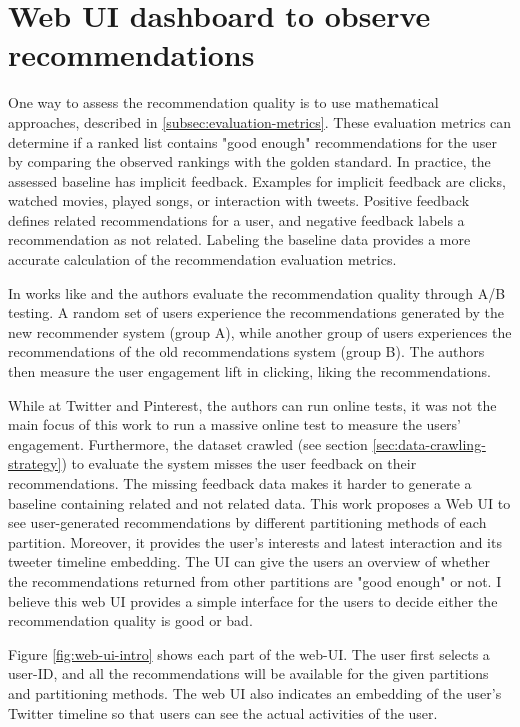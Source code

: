 \section{Web UI dashboard to observe recommendations}
\label{sec:web-ui}
One way to assess the recommendation quality is to use mathematical approaches, described in \ref{subsec:evaluation-metrics}. These evaluation metrics can determine if a ranked list contains "good enough" recommendations for the user by comparing the observed rankings with the golden standard. In practice, the assessed baseline has implicit feedback. Examples for implicit feedback are clicks, watched movies, played songs, or interaction with tweets. Positive feedback defines related recommendations for a user, and negative feedback labels a recommendation as not related. Labeling the baseline data provides a more accurate calculation of the recommendation evaluation metrics.


In works like \cite{eksombatchaiPixieSystemRecommending2018} and \cite{goelWhoToFollowSystemTwitter2015} the authors evaluate the recommendation quality through A/B testing. A random set of users experience the recommendations generated by the new recommender system (group A), while another group of users experiences the recommendations of the old recommendations system (group B). The authors then measure the user engagement lift in clicking, liking the recommendations. 


While at Twitter and Pinterest, the authors can run online tests, it was not the main focus of this work to run a massive online test to measure the users' engagement. Furthermore, the dataset crawled (see section \ref{sec:data-crawling-strategy}) to evaluate the system misses the user feedback on their recommendations. The missing feedback data makes it harder to generate a baseline containing related and not related data. This work proposes a Web UI to see user-generated recommendations by different partitioning methods of each partition. Moreover, it provides the user's interests and latest interaction and its tweeter timeline embedding. The UI can give the users an overview of whether the recommendations returned from other partitions are "good enough" or not. I believe this web UI provides a simple interface for the users to decide either the recommendation quality is good or bad.


Figure \ref{fig:web-ui-intro} shows each part of the web-UI. The user first selects a user-ID, and all the recommendations will be available for the given partitions and partitioning methods. The web UI also indicates an embedding of the user's Twitter timeline so that users can see the actual activities of the user. 

